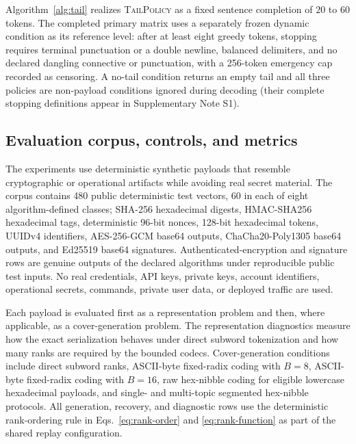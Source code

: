 \documentclass[fleqn,10pt]{wlscirep}
\begin{document}
Algorithm~\ref{alg:tail} realizes \textsc{TailPolicy} as a fixed sentence completion of \(20\) to \(60\) tokens. The completed primary matrix uses a separately frozen dynamic condition as its reference level: after at least eight greedy tokens, stopping requires terminal punctuation or a double newline, balanced delimiters, and no declared dangling connective or punctuation, with a 256-token emergency cap recorded as censoring. A no-tail condition returns an empty tail and all three policies are non-payload conditions ignored during decoding (their complete stopping definitions appear in Supplementary Note S1).

\subsection*{Evaluation corpus, controls, and metrics}\label{sec:design-method}\label{sec:quality-method}

The experiments use deterministic synthetic payloads that resemble cryptographic or operational artifacts while avoiding real secret material. The corpus contains 480 public deterministic test vectors, 60 in each of eight algorithm-defined classes; SHA-256 hexadecimal digests, HMAC-SHA256 hexadecimal tags, deterministic 96-bit nonces, 128-bit hexadecimal tokens, UUIDv4 identifiers, AES-256-GCM base64 outputs, ChaCha20-Poly1305 base64 outputs, and Ed25519 base64 signatures\cite{NIST2015SecureHashStandard,Krawczyk1997RFC2104,NIST2007GCM,NirLangley2018RFC8439,JosefssonLiusvaara2017RFC8032,Josefsson2006RFC4648,DavisPeabodyLeach2024RFC9562}. Authenticated-encryption and signature rows are genuine outputs of the declared algorithms under reproducible public test inputs. No real credentials, API keys, private keys, account identifiers, operational secrets, commands, private user data, or deployed traffic are used.

Each payload is evaluated first as a representation problem and then, where applicable, as a cover-generation problem. The representation diagnostics measure how the exact serialization behaves under direct subword tokenization and how many ranks are required by the bounded codecs. Cover-generation conditions include direct subword ranks, ASCII-byte fixed-radix coding with \(B=8\), ASCII-byte fixed-radix coding with \(B=16\), raw hex-nibble coding for eligible lowercase hexadecimal payloads, and single- and multi-topic segmented hex-nibble protocols. All generation, recovery, and diagnostic rows use the deterministic rank-ordering rule in Eqs.~\eqref{eq:rank-order} and \eqref{eq:rank-function} as part of the shared replay configuration.
\end{document}
